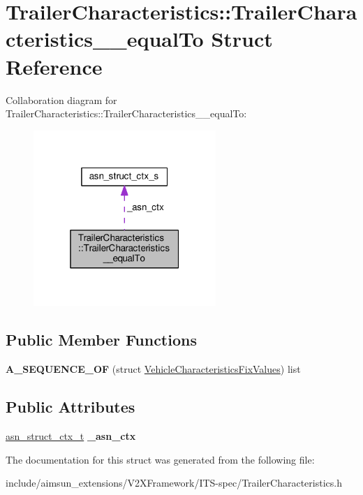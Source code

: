 \hypertarget{structTrailerCharacteristics_1_1TrailerCharacteristics____equalTo}{}\section{Trailer\+Characteristics\+:\+:Trailer\+Characteristics\+\_\+\+\_\+equal\+To Struct Reference}
\label{structTrailerCharacteristics_1_1TrailerCharacteristics____equalTo}


Collaboration diagram for Trailer\+Characteristics\+:\+:Trailer\+Characteristics\+\_\+\+\_\+equal\+To\+:\nopagebreak
\begin{figure}[H]
\begin{center}
\leavevmode
\includegraphics[width=196pt]{structTrailerCharacteristics_1_1TrailerCharacteristics____equalTo__coll__graph}
\end{center}
\end{figure}
\subsection*{Public Member Functions}
\begin{DoxyCompactItemize}
\item 
{\bfseries A\+\_\+\+S\+E\+Q\+U\+E\+N\+C\+E\+\_\+\+OF} (struct \hyperlink{structVehicleCharacteristicsFixValues}{Vehicle\+Characteristics\+Fix\+Values}) list\hypertarget{structTrailerCharacteristics_1_1TrailerCharacteristics____equalTo_a286d275ef9c0d1cf0ffac70036cea99f}{}\label{structTrailerCharacteristics_1_1TrailerCharacteristics____equalTo_a286d275ef9c0d1cf0ffac70036cea99f}

\end{DoxyCompactItemize}
\subsection*{Public Attributes}
\begin{DoxyCompactItemize}
\item 
\hyperlink{structasn__struct__ctx__s}{asn\+\_\+struct\+\_\+ctx\+\_\+t} {\bfseries \+\_\+asn\+\_\+ctx}\hypertarget{structTrailerCharacteristics_1_1TrailerCharacteristics____equalTo_aa3947255edfacece1bf01b91d9779411}{}\label{structTrailerCharacteristics_1_1TrailerCharacteristics____equalTo_aa3947255edfacece1bf01b91d9779411}

\end{DoxyCompactItemize}


The documentation for this struct was generated from the following file\+:\begin{DoxyCompactItemize}
\item 
include/aimsun\+\_\+extensions/\+V2\+X\+Framework/\+I\+T\+S-\/spec/Trailer\+Characteristics.\+h\end{DoxyCompactItemize}
